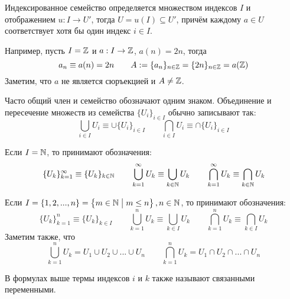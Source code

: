 Индексированное семейство определяется множеством индексов $I$ и отображением
${u:I\to U'}$, тогда $U=u(I)\subseteq U'$,
причём каждому $a\in U$ соответствует хотя бы один индекс $i\in I$.

Например, пусть $I=\mathbb Z$ и $a:I\to \mathbb Z$, $a(n)=2n$, тогда
\[
	a_{n}\equiv a(n)=2n\qquad A:=\{a_{n}\}_{n\in\mathbb Z}=\{2n\}_{n\in\mathbb Z}=a(\mathbb Z)
\]
Заметим, что $a$ не является сюръекцией и $A\neq \mathbb Z$.

Часто общий член и семейство обозначают одним знаком.
Объединение и пересечение множеств из семейства $\{U_{i}\}_{i\in I}$
обычно записывают так:
\[
	\bigcup_{i\in I}U_{i}\equiv\cup \{U_{i}\}_{i\in I}\qquad
	\bigcap_{i\in I}U_{i}\equiv\cap \{U_{i}\}_{i\in I}
\]

Если $I=\mathbb N$, то принимают обозначения:
\[
	\{U_{k}\}_{k=1}^{\infty}\equiv\{U_{k}\}_{k\in\mathbb N}\qquad
	\bigcup_{k=1}^{\infty}U_{k}\equiv\bigcup_{k\in\mathbb N}U_{k}\qquad
	\bigcap_{k=1}^{\infty}U_{k}\equiv\bigcap_{k\in\mathbb N}U_{k}
\]

Если $I=\{1,2,...,n\}=\left\{m\in\mathbb N\;\big|\;m\leq n\right\},n\in\mathbb N$,
то принимают обозначения:
\[
	\{U_{k}\}_{k=1}^{n}\equiv\{U_{k}\}_{k\in I}\qquad
	\bigcup_{k=1}^{n}U_{k}\equiv\bigcup_{k\in I}U_{k}\qquad
	\bigcap_{k=1}^{n}U_{k}\equiv\bigcap_{k\in I}U_{k}
\]
Заметим также, что
\[
	\bigcup_{k=1}^{n}U_{k}=U_1\cup U_2\cup ...\cup U_{n}\qquad
	\bigcap_{k=1}^{n}U_{k}=U_1\cap U_2\cap ...\cap U_{n}
\]

В формулах выше термы индексов $i$ и $k$ также называют связанными переменными.


